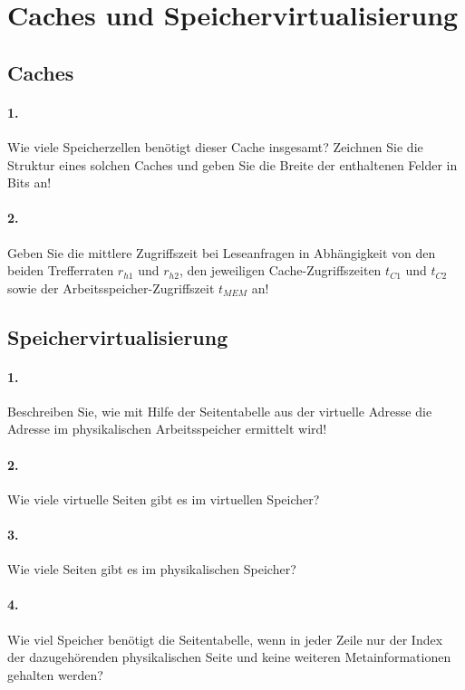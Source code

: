 \documentclass[paper=a4, fontsize=11pt]{scrartcl}
\numberwithin{equation}{section}
\numberwithin{figure}{section}
\numberwithin{table}{section}
\begin{document}
\section{Caches und Speichervirtualisierung}
\subsection{Caches}

\paragraph{1.}
Wie viele Speicherzellen benötigt dieser Cache insgesamt? Zeichnen Sie die Struktur eines solchen Caches und geben Sie die Breite der enthaltenen Felder in Bits an!

\paragraph{2.}
Geben Sie die mittlere Zugriffszeit bei Leseanfragen in Abhängigkeit von den beiden Trefferraten $r_{h1}$ und $r_{h2}$, den jeweiligen Cache-Zugriffszeiten $t_{C1}$ und $t_{C2}$ sowie der Arbeitsspeicher-Zugriffszeit $t_{MEM}$ an!

\subsection{Speichervirtualisierung}

\paragraph{1.}
Beschreiben Sie, wie mit Hilfe der Seitentabelle aus der virtuelle Adresse die Adresse im physikalischen Arbeitsspeicher ermittelt wird!

\paragraph{2.}
Wie viele virtuelle Seiten gibt es im virtuellen Speicher?

\paragraph{3.}
Wie viele Seiten gibt es im physikalischen Speicher?

\paragraph{4.}
Wie viel Speicher benötigt die Seitentabelle, wenn in jeder Zeile nur der Index der dazugehörenden physikalischen Seite und keine weiteren Metainformationen gehalten werden?

\end{document}

